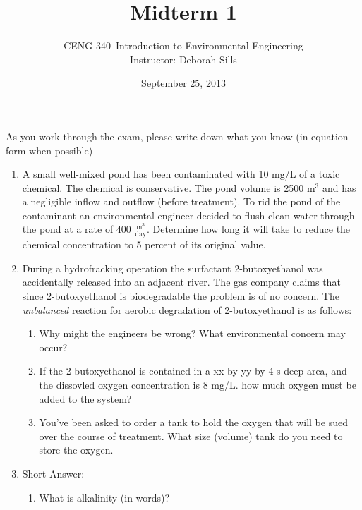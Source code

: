 \documentclass[12pt,letterpaper]{article}
\begin{document}
\setlength{\parindent}{0cm} 


\frenchspacing

\title {Midterm 1} 
\author {CENG 340--Introduction to Environmental Engineering\\
Instructor: Deborah Sills}
\date {September 25, 2013}
\maketitle

As you work through the exam, please write down what you know (in equation form when possible)
\begin{enumerate}
\item A small well-mixed pond has been contaminated with 10 mg/L of a toxic chemical.  The chemical is conservative.  The pond volume is 2500 m$^3$ and has a negligible inflow and outflow (before treatment).  To rid the pond of the contaminant an environmental engineer decided to flush clean water through the pond at a rate of 400 $\mathrm{\frac{m^3}{day}}$.  Determine how long it will take to reduce the chemical concentration to 5 percent of its original value.


\item During a hydrofracking operation the surfactant 2-butoxyethanol was accidentally released into an adjacent river.  The gas company claims that since 2-butoxyethanol is biodegradable the problem is of no concern.  The \emph{unbalanced} reaction for aerobic degradation of 2-butoxyethanol is as follows:

\begin{enumerate}
\item Why might the engineers be wrong?  What environmental concern may occur?

\item If the 2-butoxyethanol is contained in a xx by yy by 4 s deep area, and the dissovled oxygen concentration is 8 mg/L.  how much oxygen must be added to the system?  

\item You've been asked to order a tank to hold the oxygen that will be sued over the course of treatment.  What size (volume) tank do you need to store the oxygen.


\end{enumerate}
\item Short Answer:

\begin{enumerate}

\item What is alkalinity (in words)?


\end{enumerate}
\end{enumerate}
\end{document}
